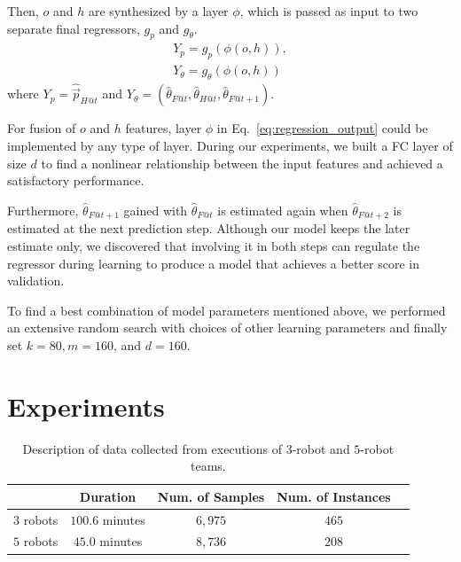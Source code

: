 \documentclass[letterpaper, 10 pt, conference]{ieeeconf}  %
\begin{document}
	Then, $o$ and $h$ are synthesized by a layer $\phi$, which is
	passed as input to two separate final regressors, $g_{p}$ and $g_\theta$.
	\begin{equation}
        \begin{split}
        Y_{p} = g_{p}(\phi(o, h)),\\
        Y_{\theta}= g_{\theta}(\phi(o, h))
        \end{split}
        \label{eq:regression_output}
	\end{equation}
	where
	$Y_{p} = \hat{\vec{p}}_{H@t}$ and
	$Y_{\theta} = (\hat{\theta}_{F@t}, \hat{\theta}_{H@t}, \hat{\theta}_{F@t+1})$.

    For fusion of $o$ and $h$ features, layer $\phi$ in
    Eq.~\eqref{eq:regression_output} could be implemented by any type of
    layer. During our experiments, we built a FC layer of size $d$ to
    find a nonlinear relationship between the input features and
    achieved a satisfactory performance.

    Furthermore, $\hat{\theta}_{F@t+1}$ gained with $\hat{\theta}_{F@t}$
    is estimated again when $\hat{\theta}_{F@t+2}$ is estimated at the
    next prediction step. Although our model keeps the later estimate
    only, we discovered that involving it in both steps can regulate the
    regressor during learning to produce a model that achieves a better
    score in validation.

    To find a best combination of model parameters mentioned above, we
    performed an extensive random search with choices of other learning
    parameters and finally set $k=80, m=160$, and $d=160$.

	\section{Experiments}
	\label{sec:experiments}

	\setlength{\tabcolsep}{0.5em} %
	{\renewcommand{\arraystretch}{1.2}%
		\begin{table}[t]
			\centering
			\begin{tabular}{|c|c|c|c|c|}
				\hline
							&  Duration & Num. of Samples & Num. of Instances  \\ \hline
				$3$ robots & $100.6$ minutes & $6,975$ & $465$  \\ \hline
				$5$ robots & $45.0$ minutes  & $8,736$ & $208$  \\ \hline
			\end{tabular}
			\caption{Description of data collected from executions of $3$-robot and $5$-robot teams.}
			\label{table:data_description}
		\end{table}
	}
\end{document}
